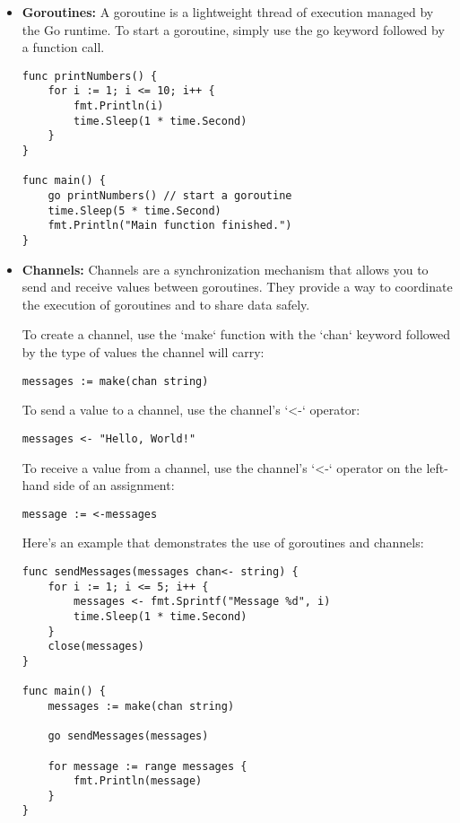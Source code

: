 \documentclass{article}
\begin{document}
\begin{itemize}
\item \textbf{Goroutines:} A goroutine is a lightweight thread of execution managed by the Go runtime. To start a goroutine, simply use the go keyword followed by a function call.
\begin{verbatim}
func printNumbers() {
    for i := 1; i <= 10; i++ {
        fmt.Println(i)
        time.Sleep(1 * time.Second)
    }
}

func main() {
    go printNumbers() // start a goroutine
    time.Sleep(5 * time.Second)
    fmt.Println("Main function finished.")
}
\end{verbatim}
\item \textbf{Channels:} Channels are a synchronization mechanism that allows you to send and receive values between goroutines. They provide a way to coordinate the execution of goroutines and to share data safely.

To create a channel, use the `make` function with the `chan` keyword followed by the type of values the channel will carry:

\begin{verbatim}
messages := make(chan string)
\end{verbatim}

To send a value to a channel, use the channel's `<-` operator:

\begin{verbatim}
messages <- "Hello, World!"
\end{verbatim}

To receive a value from a channel, use the channel's `<-` operator on the left-hand side of an assignment:

\begin{verbatim}
message := <-messages
\end{verbatim}

Here's an example that demonstrates the use of goroutines and channels:

\begin{verbatim}
func sendMessages(messages chan<- string) {
    for i := 1; i <= 5; i++ {
        messages <- fmt.Sprintf("Message %d", i)
        time.Sleep(1 * time.Second)
    }
    close(messages)
}

func main() {
    messages := make(chan string)

    go sendMessages(messages)

    for message := range messages {
        fmt.Println(message)
    }
}
\end{verbatim}
\end{itemize}
\end{document}
